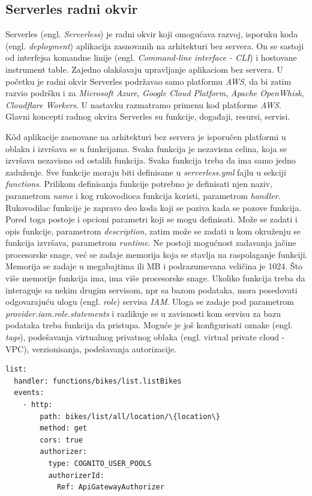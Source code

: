 \documentclass[12pt,oneside]{memoir}
\begin{document}
\subsection{Serverles radni okvir}

Serverles (engl. \emph{Serverless}) je radni okvir koji omogućava razvoj, isporuku koda (engl. \emph{deployment}) aplikacija zasnovanih na arhitekturi bez servera. On se sastoji od interfejsa komandne linije (engl. \emph{Command-line interface - CLI}) i hostovane instrument table. Zajedno olakšavaju upravljanje aplikaciom bez servera. U početku je radni okvir Serverles podržavao samo platformu \emph{AWS}, da bi zatim razvio podršku i za \emph{Microsoft Azure}, \emph{Google Cloud Platform}, \emph{Apache OpenWhisk}, \emph{Cloudflare Workers}. U nastavku razmatramo primenu kod platforme \emph{AWS}. Glavni koncepti radnog okvira Serverles su funkcije, događaji, resursi, servisi. 

 
Kôd aplikacije zasnovane na arhitekturi bez servera je isporučen platformi u oblaku i izvršava se u funkcijama. Svaka funkcija je nezavisna celina, koja se izvršava nezavisno od ostalih funkcija. Svaka funkcija treba da ima samo jedno zaduženje. Sve funkcije moraju biti definisane u \emph{serverless.yml} fajlu u sekciji \emph{functions}. Prilikom definisanja funkcije potrebno je definisati njen naziv, parametrom \emph{name} i kog rukovodioca funkcija koristi, parametrom \emph{handler}. Rukovodilac funkcije je zapravo deo koda koji se poziva kada se pozove funkcija. Pored toga postoje i opcioni parametri koji se mogu definisati. Može se zadati i opis funkcije, parametrom \emph{description}, zatim može se zadati u kom okruženju se funkcija izvršava, parametrom \emph{runtime}. Ne postoji mogućnost zadavanja jačine procesorske snage, već se zadaje memorija koja se stavlja na raspolaganje funkciji. Memorija se zadaje u megabajtima ili MB i podrazumevana veličina je 1024. Što više memorije funkcija ima, ima više procesorske snage. Ukoliko funkcija treba da interaguje sa nekim drugim servisom, npr sa bazom podataka, mora posedovati odgovarajuću ulogu (engl. \emph{role}) servisa \emph{IAM}. Uloga se zadaje pod parametrom \emph{provider.iam.role.statements} i razlikuje se u zavisnosti kom servisu za bazu podataka treba funkcija da pristupa. Moguće je još konfigurisati oznake (engl. \emph{tags}), podešavanja virtualnog privatnog oblaka (engl. virtual private cloud - VPC), verzionisanja, podešavanja autorizacije.

\begin{lstlisting}[caption={Primer definisanja funkcije u Serverles radnom okviru},captionpos=t]
list:
  handler: functions/bikes/list.listBikes
  events:
    - http:
        path: bikes/list/all/location/\{location\}
        method: get
        cors: true
        authorizer:
          type: COGNITO_USER_POOLS
          authorizerId:
            Ref: ApiGatewayAuthorizer
\end{lstlisting}
 
\end{document}

